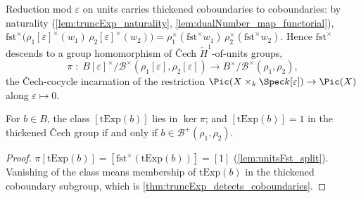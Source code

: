 \begin{definition}
  \label{def:cech_units_reduction}
  \leanok
  Reduction mod \(\varepsilon\) on units carries thickened coboundaries to
  coboundaries: by naturality (\ref{lem:truncExp_naturality},
  \ref{lem:dualNumber_map_functorial}),
  \(\mathrm{fst}^\times\bigl(\rho_1[\varepsilon]^\times(w_1)\,
  \rho_2[\varepsilon]^\times(w_2)\bigr) =
  \rho_1^\times(\mathrm{fst}^\times w_1)\, \rho_2^\times(\mathrm{fst}^\times w_2)\).
  Hence \(\mathrm{fst}^\times\) descends to a group homomorphism of \v{C}ech
  \(\check H^1\)-of-units groups,
  \[
    \pi \;:\;
    B[\varepsilon]^\times \big/ \mathcal B^\times(\rho_1[\varepsilon],
      \rho_2[\varepsilon])
    \longrightarrow
    B^\times \big/ \mathcal B^\times(\rho_1, \rho_2),
  \]
  the \v{C}ech-cocycle incarnation of the restriction
  \(\Pic(X \times_k \Spec k[\varepsilon]) \to \Pic(X)\) along
  \(\varepsilon \mapsto 0\).
\end{definition}

\begin{lemma}
  \label{lem:cech_kernel_truncExp_class}
  \leanok
  For \(b \in B\), the class \([\mathrm{tExp}(b)]\) lies in \(\ker \pi\); and
  \([\mathrm{tExp}(b)] = 1\) in the thickened \v{C}ech group if and only if
  \(b \in \mathcal B^+(\rho_1, \rho_2)\).
\end{lemma}
\begin{proof}
  \leanok
  \(\pi[\mathrm{tExp}(b)] = [\mathrm{fst}^\times(\mathrm{tExp}(b))] = [1]\)
  (\ref{lem:unitsFst_split}). Vanishing of the class means membership of
  \(\mathrm{tExp}(b)\) in the thickened coboundary subgroup, which is
  \ref{thm:truncExp_detects_coboundaries}.
\end{proof}

